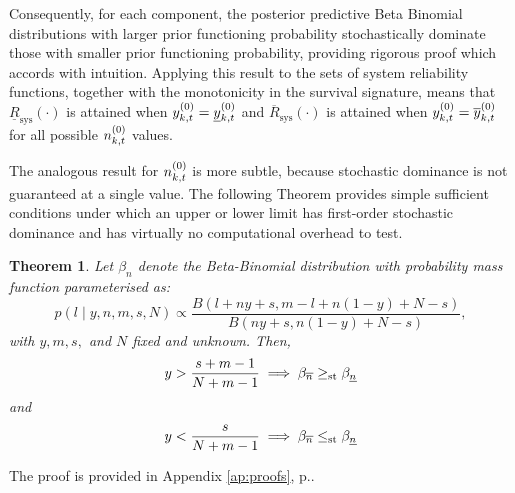 \documentclass[12pt, a4paper]{elsarticle}
\newtheorem{theorem}{Theorem}
\newcommand{\ul}[1]{\underline{#1}}
\newcommand{\ol}[1]{\overline{#1}}
\newcommand{\lRsys}{\ul{R}_\text{sys}}
\newcommand{\uRsys}{\ol{R}_\text{sys}}
\begin{document}
Consequently, for each component, the posterior predictive Beta Binomial distributions 
with larger prior functioning probability stochastically dominate those
with smaller prior functioning probability, providing rigorous proof 
which accords with intuition. Applying this result to the sets of system reliability 
functions, together with the monotonicity in the survival signature, means that
$\lRsys(\cdot)$ is attained when $\yktz = \yktzl$ and $\uRsys(\cdot)$
is attained when $\yktz = \yktzu$ for all possible $n^{(0)}_{k,t}$ values.

The analogous result for $n^{(0)}_{k,t}$ is more subtle, because stochastic 
dominance is not guaranteed at a single value.  The following Theorem 
provides simple sufficient conditions under which an upper or lower 
limit has first-order stochastic dominance and has virtually no 
computational overhead to test.

\begin{theorem}
  \label{thm:n}
  Let $\beta_n$ denote the Beta-Binomial distribution with probability mass function parameterised as:
  \[ p(l \mid y, n, m, s, N) \propto \frac{B(l + ny + s, m - l + n(1-y) + N - s)}{B(ny + s, n(1-y) + N - s)}, \]
  with $y, m, s,$ and $N$ fixed and unknown.  
  Then,
  \[ y > \frac{s + m - 1}{N + m - 1} \implies \beta_{\nu} \ge_{\mathrm{st}} \beta_{\nl} \]
  and 
  \[ y < \frac{s}{N + m - 1} \implies \beta_{\nu} \le_{\mathrm{st}} \beta_{\nl} \]
\end{theorem}
The proof is provided in Appendix \ref{ap:proofs}, p.\pageref{prf:n}.
\end{document}
